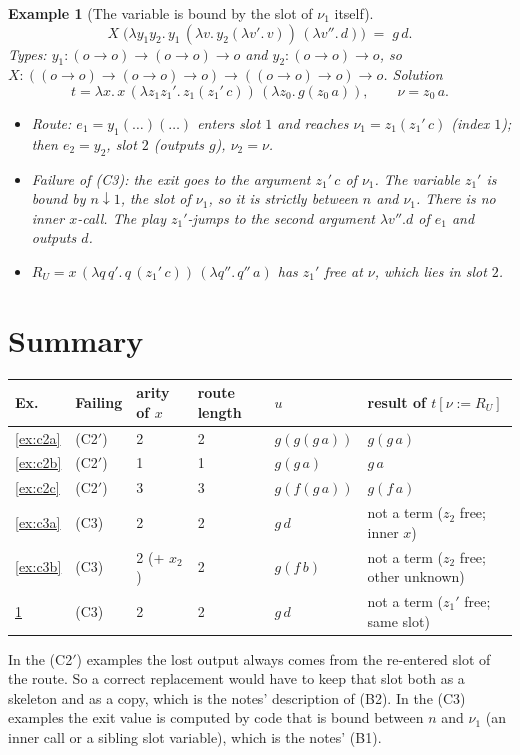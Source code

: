 \documentclass[11pt]{article}
\newtheorem{example}{Example}
\newcommand{\suc}[2]{#1\!\downarrow\!#2}
\begin{document}
\begin{example}[The variable is bound by the slot of $\nu_1$ itself]\label{ex:c3c}
\[
X\;\bigl(\lambda y_1y_2.\,y_1\,(\lambda v.\,y_2(\lambda v'.\,v))\,(\lambda v''.\,d)\bigr)\;=\;g\,d.
\]
Types: $y_1:(o\to o)\to(o\to o)\to o$ and $y_2:(o\to o)\to o$, so
$X:((o\to o)\to(o\to o)\to o)\to((o\to o)\to o)\to o$.  Solution
\[
t=\lambda x.\,x\,(\lambda z_1z_1'.\,z_1(z_1'\,c))\,(\lambda z_0.\,g(z_0\,a)),
\qquad \nu=z_0\,a .
\]
\begin{itemize}
\item Route: $e_1=y_1(\dots)(\dots)$ enters slot $1$ and reaches
  $\nu_1=z_1(z_1'\,c)$ (index $1$); then $e_2=y_2$, slot $2$ (outputs $g$),
  $\nu_2=\nu$.
\item Failure of (C3): the exit goes to the argument $z_1'\,c$ of $\nu_1$.
  The variable $z_1'$ is bound by $\suc n1$, the slot of $\nu_1$, so it is
  strictly between $n$ and $\nu_1$.  There is no inner $x$-call.  The play
  $z_1'$-jumps to the second argument $\lambda v''.d$ of $e_1$ and outputs
  $d$.
\item $R_U=x\,(\lambda q\,q'.\,q\,(z_1'\,c))\,(\lambda q''.\,q''\,a)$ has
  $z_1'$ free at $\nu$, which lies in slot $2$.
\end{itemize}
\end{example}

\section*{Summary}

\begin{center}
\small
\begin{tabular}{llllll}
Ex. & Failing & arity of $x$ & route length & $u$ & result of $t[\nu:=R_U]$\\\hline
\ref{ex:c2a} & (C2$'$) & 2 & 2 & $g(g(g\,a))$ & $g(g\,a)$\\
\ref{ex:c2b} & (C2$'$) & 1 & 1 & $g(g\,a)$ & $g\,a$\\
\ref{ex:c2c} & (C2$'$) & 3 & 3 & $g(f(g\,a))$ & $g(f\,a)$\\
\ref{ex:c3a} & (C3) & 2 & 2 & $g\,d$ & not a term ($z_2$ free; inner $x$)\\
\ref{ex:c3b} & (C3) & 2 (+ $x_2$) & 2 & $g(f\,b)$ & not a term ($z_2$ free; other unknown)\\
\ref{ex:c3c} & (C3) & 2 & 2 & $g\,d$ & not a term ($z_1'$ free; same slot)
\end{tabular}
\end{center}

In the (C2$'$) examples the lost output always comes from the re-entered
slot of the route.  So a correct replacement would have to keep that
slot both as a skeleton and as a copy, which is the notes' description
of (B2).  In the (C3) examples the exit value is computed by code that is
bound between $n$ and $\nu_1$ (an inner call or a sibling slot
variable), which is the notes' (B1).
\end{document}
